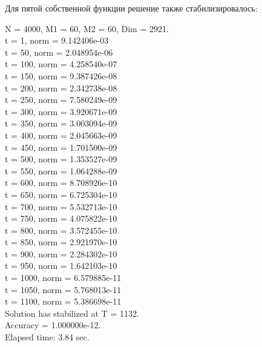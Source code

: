 \documentclass[12pt,a4paper]{article}
\begin{document}
Для пятой собственной функции решение также стабилизировалось:
\begin{center}
N = 4000, M1 =  60, M2 =  60, Dim =   2921. \\
t =   1, norm = 9.142406e-03 \\
t =  50, norm = 2.048954e-06 \\
t = 100, norm = 4.258540e-07 \\
t = 150, norm = 9.387426e-08 \\
t = 200, norm = 2.342738e-08 \\
t = 250, norm = 7.580249e-09 \\
t = 300, norm = 3.920671e-09 \\
t = 350, norm = 3.003094e-09 \\
t = 400, norm = 2.045663e-09 \\
t = 450, norm = 1.701500e-09 \\
t = 500, norm = 1.353527e-09 \\
t = 550, norm = 1.064288e-09 \\
t = 600, norm = 8.708926e-10 \\
t = 650, norm = 6.725304e-10 \\
t = 700, norm = 5.532713e-10 \\
t = 750, norm = 4.075822e-10 \\
t = 800, norm = 3.572455e-10 \\
t = 850, norm = 2.921970e-10 \\
t = 900, norm = 2.284302e-10 \\
t = 950, norm = 1.642103e-10 \\
t = 1000, norm = 6.579885e-11 \\
t = 1050, norm = 5.768013e-11 \\
t = 1100, norm = 5.386698e-11 \\
Solution has stabilized at T = 1132. \\
Accuracy = 1.000000e-12. \\
Elapsed time: 3.84 sec.
\end{center}
\end{document}
